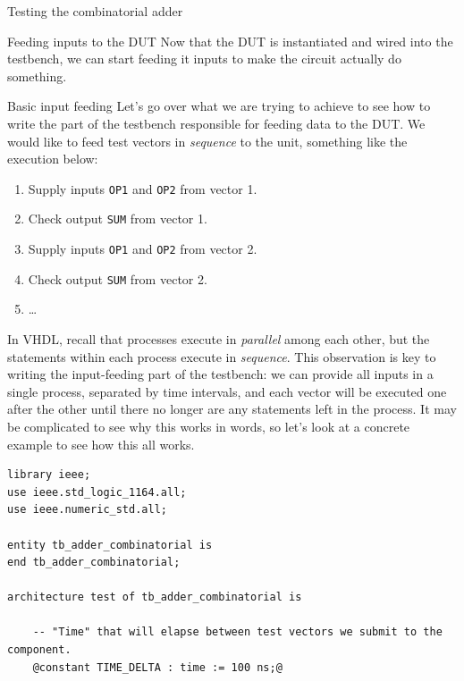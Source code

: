 \documentclass[lab]{course}
\begin{document}
\begin{section}{Testing the combinatorial adder}
    \begin{subsection}{Feeding inputs to the DUT}
        Now that the DUT is instantiated and wired into the testbench, we can start feeding it inputs to make the circuit actually do something.

        \begin{subsubsection}{Basic input feeding}
            \label{sec:combinatorial_basic_input_feeding}
            Let's go over what we are trying to achieve to see how to write the part of the testbench responsible for feeding data to the DUT. We would like to feed test vectors in \emph{sequence} to the unit, something like the execution below:

            \begin{enumerate}
                \item Supply inputs \verb+OP1+ and \verb+OP2+ from vector 1.
                \item Check output \verb+SUM+ from vector 1.
                \item Supply inputs \verb+OP1+ and \verb+OP2+ from vector 2.
                \item Check output \verb+SUM+ from vector 2.
                \item \ldots
            \end{enumerate}

            In VHDL, recall that processes execute in \emph{parallel} among each other, but the statements within each process execute in \emph{sequence}. This observation is key to writing the input-feeding part of the testbench: we can provide all inputs in a single process, separated by time intervals, and each vector will be executed one after the other until there no longer are any statements left in the process. It may be complicated to see why this works in words, so let's look at a concrete example to see how this all works.

            \begin{lstlisting}[caption={Simulation process (basic)}, label={lst:combinatorial_simulation_process_1_test_vector}]
library ieee;
use ieee.std_logic_1164.all;
use ieee.numeric_std.all;

entity tb_adder_combinatorial is
end tb_adder_combinatorial;

architecture test of tb_adder_combinatorial is

    -- "Time" that will elapse between test vectors we submit to the component.
    @constant TIME_DELTA : time := 100 ns;@


\end{lstlisting}
\end{subsubsection}
\end{subsection}
\end{section}
\end{document}
